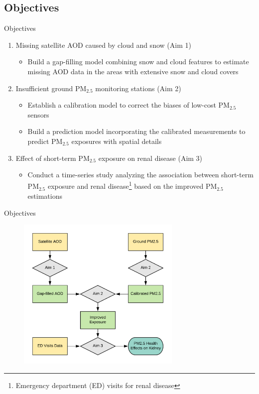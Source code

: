 \documentclass[handout]{beamer} %
\begin{document}
\subsection{Objectives}
\begin{frame}{Objectives}
    \begin{enumerate}
        \item<1> Missing satellite AOD caused by cloud and snow (Aim 1)
            \begin{itemize}
                \item \textcolor[rgb]{0.1,0.1,0.6}{Build a gap-filling model combining snow and cloud features to estimate missing AOD data in the areas with extensive snow and cloud covers}
            \end{itemize}
        \item<2> Insufficient ground PM$_{2.5}$ monitoring stations (Aim 2)
            \begin{itemize}
                \item \textcolor[rgb]{0.1,0.1,0.6}{Establish a calibration model to correct the biases of low-cost PM$_{2.5}$ sensors}
                \item \textcolor[rgb]{0.1,0.1,0.6}{Build a prediction model incorporating the calibrated measurements to predict PM$_{2.5}$ exposures with spatial details}
            \end{itemize}
        \item<3> Effect of short-term PM$_{2.5}$ exposure on renal disease (Aim 3)
            \begin{itemize}
                \item \textcolor[rgb]{0.1,0.1,0.6}{Conduct a time-series study analyzing the association between short-term PM$_{2.5}$ exposure and renal disease\footnote{Emergency department (ED) visits for renal disease} based on the improved PM$_{2.5}$ estimations}
            \end{itemize}
    \end{enumerate}
\end{frame}

\begin{frame}{Objectives}
    \begin{figure}
        \centering
        \includegraphics[width=0.7\textwidth]{img/flow.png}
    \end{figure}
\end{frame}
\end{document}
